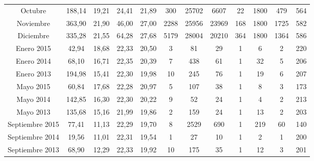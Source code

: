 \begin{table}[ht!]
{\begin{tabular}{|c|c|c|c|c|c|c|c|c|c|c|c|}
        Octubre         & 188,14    & 19,21     & 24,41  & 21,89 & 300   & 25702 & 6607  & 22   & 1800  & 479    & 564 \\
        Noviembre       & 363,90    & 21,90     & 46,00  & 27,00 & 2288  & 25956 & 23969 & 168  & 1800  & 1725   & 582 \\
        Diciembre       & 335,28    & 21,55     & 64,28  & 27,68 & 5179  & 28004 & 20210 & 364  & 1800  & 1364   & 586 \\
        \hline 
        Enero 2015      & 42,94     & 18,68     & 22,33  & 20,50 & 3     & 81    & 29    & 1    & 6     &  2     & 220 \\
        Enero 2014      & 68,10     & 16,71     & 22,35  & 20,39 & 7     & 438   & 61    & 1    & 32    &  5     & 206 \\
        Enero 2013      & 194,98    & 15,41     & 22,30  & 19,98 & 10    & 245   & 76    & 1    & 19    &  6     & 207 \\
        Mayo 2015       & 60,84     & 17,68     & 22,28  & 20,97 & 5     & 107   & 38    & 1    & 8     &  3     & 173 \\
        Mayo 2014       & 142,85    & 16,30     & 22,30  & 20,22 & 9     & 52    & 24    & 1    & 4     &  2     & 213 \\
        Mayo 2013       & 135,68    & 15,16     & 21,99  & 19,86 & 2     & 159   & 24    & 1    & 13    &  2     & 203 \\
        Septiembre 2015 & 77,41     & 11,13     & 22,29  & 19,70 & 8     & 2529  & 690   & 1    & 219   &  60    & 140 \\
        Septiembre 2014 & 19,56     & 11,01     & 22,31  & 19,54 & 1     & 27    & 10    & 1    & 2     &  1     & 200 \\
        Septiembre 2013 & 68,90     & 12,29     & 22,33  & 19,92 & 10    & 175   & 35    & 1    & 12    &  3     & 201 \\
        \hline  
    \end{tabular}
    }   
\end{table}

